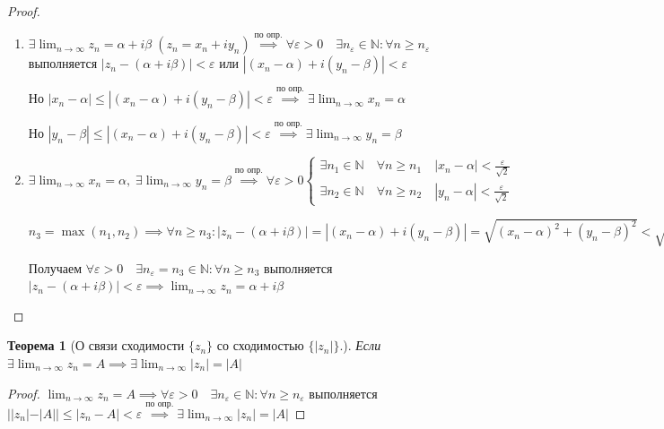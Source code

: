 \documentclass[a4paper,oneside]{article}
\newcommand{\bydef}{\stackrel{\text{по опр.}}{\implies}} %
\newcommand{\dslim}{\displaystyle\lim}
\newcommand{\dslimn}{\dslim_{n \to \infty}}
\newtheorem{theorem}{Теорема}[subsection]
\theoremstyle{definition}
\theoremstyle{definition}
\theoremstyle{definition}
\begin{document}
\begin{proof}
    \begin{enumerate}
        \item
            $\exists \dslimn z_n = \alpha + i \beta \; (z_n = x_n + i y_n)
            \bydef \forall \varepsilon > 0 \quad \exists n_\varepsilon \in \mathbb{N}:
            \forall n \ge n_\varepsilon$ выполняется $|z_n - (\alpha + i \beta)| < \varepsilon$
            или $|(x_n- \alpha) + i (y_n - \beta)| < \varepsilon$
        
            Но $|x_n - \alpha| \le |(x_n - \alpha) + i (y_n - \beta)| < \varepsilon
            \bydef \exists \dslimn x_n = \alpha$
        
            Но $|y_n - \beta| \le |(x_n - \alpha) + i (y_n - \beta)| < \varepsilon
            \bydef \exists \dslimn y_n = \beta$
    
        \item 
            $\exists \dslimn x_n = \alpha, \; \exists \dslimn y_n = \beta
            \bydef \forall \varepsilon > 0 \begin{cases}
                \exists n_1 \in \mathbb{N} \quad \forall n \ge n_1 \quad |x_n - \alpha| < \frac{\varepsilon}{\sqrt{2}} \\
                \exists n_2 \in \mathbb{N} \quad \forall n \ge n_2 \quad |y_n - \alpha| < \frac{\varepsilon}{\sqrt{2}}
            \end{cases}$
            
            $n_3 = \max (n_1, n_2) \implies \forall n \ge n_3:
            |z_n - (\alpha + i \beta)| = |(x_n - \alpha) + i (y_n - \beta)| =
            \sqrt{(x_n - \alpha)^2 + (y_n - \beta)^2} <
            \sqrt{\frac{\varepsilon^2}{2} + \frac{\varepsilon^2}{2}} = \varepsilon$
        
            Получаем $\forall \varepsilon > 0 \quad \exists n_\varepsilon = n_3 \in \mathbb{N}:
            \forall n \ge n_3$ выполняется $|z_n - (\alpha + i \beta)| < \varepsilon
            \implies \dslimn z_n = \alpha + i \beta$
    \end{enumerate}
\end{proof}

\begin{theorem}[О связи сходимости $\{z_n\}$ со сходимостью $\{|z_n|\}$.]
    Если $\exists \dslimn z_n = A \implies \exists \dslimn |z_n| = |A|$
\end{theorem}

\begin{proof}
    $\dslimn z_n = A \implies \forall \varepsilon > 0 \quad \exists n_\varepsilon \in \mathbb{N}:
    \forall n \ge n_\varepsilon$ выполняется $||z_n| - |A|| \le |z_n - A| < \varepsilon
    \bydef \exists \dslimn |z_n| = |A|$
\end{proof}
\end{document}
